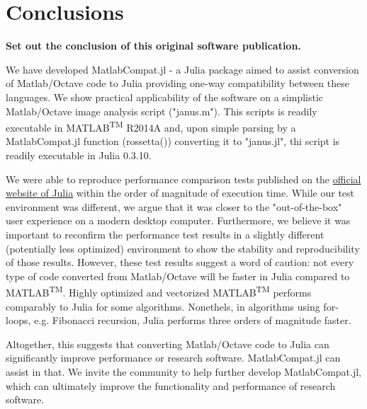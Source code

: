 \section{Conclusions}
\label{} 

\textbf{Set out the conclusion of this original software publication.}

We have developed MatlabCompat.jl - a Julia package aimed to assist conversion of Matlab/Octave code to Julia providing one-way compatibility between these languages. We show practical applicability of the software on a simplistic Matlab/Octave image analysis script ("janus.m"). This scripts is readily executable in MATLAB\textsuperscript{TM} R2014A and, upon simple parsing by a MatlabCompat.jl function (rossetta()) converting it to "janus.jl", thi script is readily executable in Julia 0.3.10.

We were able to reproduce performance comparison tests published on the \href{http://julialang.org/benchmarks/}{official website of Julia} within the order of magnitude of execution time. While our test environment was different, we argue that it was closer to the "out-of-the-box" user experience on a modern desktop computer. Furthermore, we believe it was important to reconfirm the performance test results in a slightly different (potentially less optimized) environment to show the stability and reproducibility of those results. However, these test results suggest a word of caution: not every type of code converted from Matlab/Octave will be faster in Julia compared to MATLAB\textsuperscript{TM}. Highly optimized and vectorized MATLAB\textsuperscript{TM} performs comparably to Julia for some algorithms. Nonethels, in algorithms using for-loops, e.g. Fibonacci recursion, Julia performs three orders of magnitude faster.

Altogether, this suggests that converting Matlab/Octave code to Julia can significantly improve performance or research software. MatlabCompat.jl can assist in that. We invite the community to help further develop MatlabCompat.jl, which can ultimately improve the functionality and performance of research software.
  
  
  